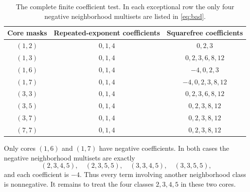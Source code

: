 \begin{table}[ht]
\centering
\begin{tabular}{ccc}
\toprule
Core masks & Repeated-exponent coefficients & Squarefree coefficients\\
\midrule
$(1,2)$ & $0,1,4$ & $0,2,3$\\
$(1,3)$ & $0,1,4$ & $0,2,3,6,8,12$\\
$(1,6)$ & $0,1,4$ & $-4,0,2,3$\\
$(1,7)$ & $0,1,4$ & $-4,0,2,3,8,12$\\
$(3,3)$ & $0,1,4$ & $0,2,3,6,8,12$\\
$(3,5)$ & $0,1,4$ & $0,2,3,8,12$\\
$(3,7)$ & $0,1,4$ & $0,2,3,8,12$\\
$(7,7)$ & $0,1,4$ & $0,2,3,8,12$\\
\bottomrule
\end{tabular}
\caption{The complete finite coefficient test. In each exceptional row the only four negative neighborhood multisets are listed in \eqref{eq:bad}.}\label{tab:coeff}
\end{table}

Only cores $(1,6)$ and $(1,7)$ have negative coefficients. In both cases the negative neighborhood multisets are exactly
\begin{equation}\label{eq:bad}
 (2,3,4,5),\quad(2,3,5,5),\quad(3,3,4,5),\quad(3,3,5,5),
\end{equation}
and each coefficient is $-4$. Thus every term involving another neighborhood class is nonnegative. It remains to treat the four classes $2,3,4,5$ in these two cores.

